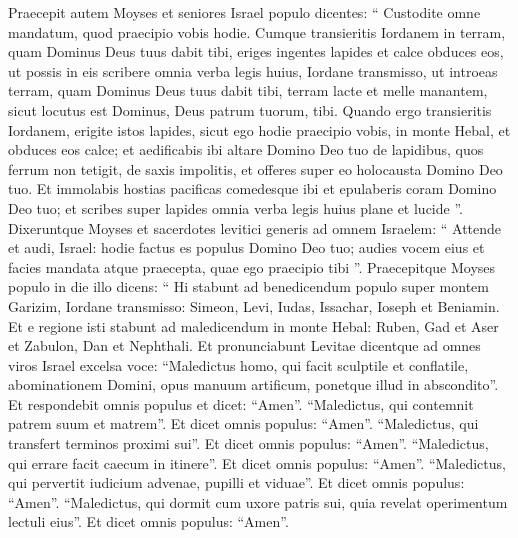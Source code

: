 \begin{biblechapter}
\begin{biblechapter}
\begin{biblechapter}
\begin{biblechapter}
\begin{biblechapter}
\begin{biblechapter}
\begin{biblechapter}
\begin{biblechapter}
\begin{biblechapter}
\begin{biblechapter}
\begin{biblechapter}
\begin{biblechapter}
\begin{biblechapter}
\begin{biblechapter}
\begin{biblechapter}
\begin{biblechapter}
\begin{biblechapter}
\begin{biblechapter}
\begin{biblechapter}
\begin{biblechapter}
\begin{biblechapter}
\begin{biblechapter}
\begin{biblechapter}
\begin{biblechapter}
\begin{biblechapter}
\begin{biblechapter}
\begin{biblechapter}
\verse Praecepit autem Moyses et seniores Israel populo dicentes: “ Custodite omne mandatum, quod praecipio vobis hodie. 
\verse Cumque transieritis Iordanem in terram, quam Dominus Deus tuus dabit tibi, eriges ingentes lapides et calce obduces eos, 
 \verse ut possis in eis scribere omnia verba legis huius, Iordane transmisso, ut introeas terram, quam Dominus Deus tuus dabit tibi, terram lacte et melle manantem, sicut locutus est Dominus, Deus patrum tuorum, tibi. 
\verse Quando ergo transieritis Iordanem, erigite istos lapides, sicut ego hodie praecipio vobis, in monte Hebal, et obduces eos calce; 
\verse et aedificabis ibi altare Domino Deo tuo de lapidibus, quos ferrum non tetigit, 
\verse de saxis impolitis, et offeres super eo holocausta Domino Deo tuo. 
\verse Et immolabis hostias pacificas comedesque ibi et epulaberis coram Domino Deo tuo; 
\verse et scribes super lapides omnia verba legis huius plane et lucide ”.
 \verse Dixeruntque Moyses et sacerdotes levitici generis ad omnem Israelem: “ Attende et audi, Israel: hodie factus es populus Domino Deo tuo; 
\verse audies vocem eius et facies mandata atque praecepta, quae ego praecipio tibi ”.
 \verse Praecepitque Moyses populo in die illo dicens: 
\verse “ Hi stabunt ad benedicendum populo super montem Garizim, Iordane transmisso: Simeon, Levi, Iudas, Issachar, Ioseph et Beniamin. 
\verse Et e regione isti stabunt ad maledicendum in monte Hebal: Ruben, Gad et Aser et Zabulon, Dan et Nephthali. 
 \verse Et pronunciabunt Levitae dicentque ad omnes viros Israel excelsa voce:
 \verse “Maledictus homo, qui facit sculptile et conflatile, abominationem Domini, opus manuum artificum, ponetque illud in abscondito”. Et respondebit omnis populus et dicet: “Amen”.
 \verse “Maledictus, qui contemnit patrem suum et matrem”. Et dicet omnis populus: “Amen”.
 \verse “Maledictus, qui transfert terminos proximi sui”. Et dicet omnis populus: “Amen”.
 \verse “Maledictus, qui errare facit caecum in itinere”. Et dicet omnis populus: “Amen”.
 \verse “Maledictus, qui pervertit iudicium advenae, pupilli et viduae”. Et dicet omnis populus: “Amen”.
 \verse “Maledictus, qui dormit cum uxore patris sui, quia revelat operimentum lectuli eius”. Et dicet omnis populus: “Amen”.

\end{biblechapter}
\end{biblechapter}
\end{biblechapter}
\end{biblechapter}
\end{biblechapter}
\end{biblechapter}
\end{biblechapter}
\end{biblechapter}
\end{biblechapter}
\end{biblechapter}
\end{biblechapter}
\end{biblechapter}
\end{biblechapter}
\end{biblechapter}
\end{biblechapter}
\end{biblechapter}
\end{biblechapter}
\end{biblechapter}
\end{biblechapter}
\end{biblechapter}
\end{biblechapter}
\end{biblechapter}
\end{biblechapter}
\end{biblechapter}
\end{biblechapter}
\end{biblechapter}
\end{biblechapter}
